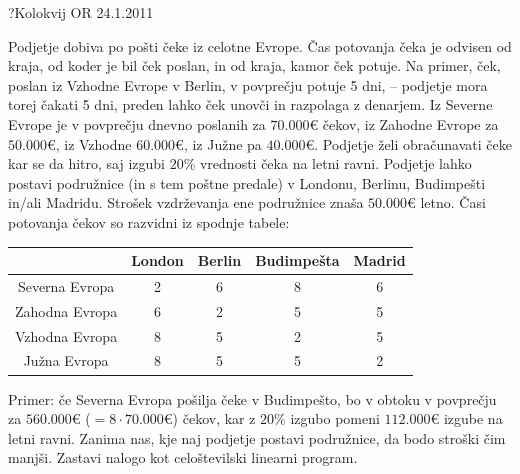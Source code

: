 \begin{naloga}{?}{Kolokvij OR 24.1.2011}
\begin{vprasanje}
Podjetje dobiva po pošti čeke iz celotne Evrope.
Čas potovanja čeka je odvisen od kraja, od koder je bil ček poslan,
in od kraja, kamor ček potuje.
Na primer, ček, poslan iz Vzhodne Evrope v Berlin, v povprečju potuje 5 dni,
-- podjetje mora torej čakati 5 dni,
preden lahko ček unovči in razpolaga z denarjem.
Iz Severne Evrope je v povprečju dnevno poslanih za $70.000 €$ čekov,
iz Zahodne Evrope za $50.000 €$, iz Vzhodne $60.000 €$,
iz Južne pa $40.000 €$.
Podjetje želi obračunavati čeke kar se da hitro,
saj izgubi $20\%$ vrednosti čeka na letni ravni.
Podjetje lahko postavi podružnice (in s tem poštne predale)
v Londonu, Berlinu, Budimpešti in/ali Madridu.
Strošek vzdrževanja ene podružnice znaša $50.000 €$ letno.
Časi potovanja čekov so razvidni iz spodnje tabele:
\begin{center}
\begin{tabular}{c|cccc}
& London & Berlin & Budimpešta & Madrid \\ \hline
Severna Evropa & 2 & 6 & 8 & 6 \\
Zahodna Evropa & 6 & 2 & 5 & 5 \\
Vzhodna Evropa & 8 & 5 & 2 & 5 \\
Južna Evropa   & 8 & 5 & 5 & 2
\end{tabular}
\end{center}
Primer: če Severna Evropa pošilja čeke v Budimpešto,
bo v obtoku v pov\-preč\-ju za $560.000 €$ ($= 8 \cdot 70.000 €$) čekov,
kar z $20\%$ izgubo pomeni $112.000 €$ izgube na letni ravni.
Zanima nas, kje naj podjetje postavi podružnice, da bodo stroški čim manjši.
Zastavi nalogo kot celoštevilski linearni program.
\end{vprasanje}
\begin{odgovor}
\end{odgovor}
\end{naloga}



